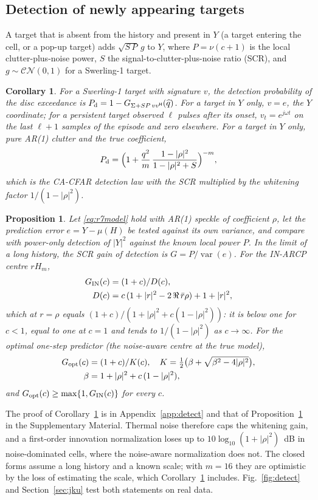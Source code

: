 \documentclass[journal]{IEEEtran}
\newtheorem{proposition}{Proposition}
\newtheorem{corollary}{Corollary}
\begin{document}
\subsection{Detection of newly appearing targets}
A target that is absent from the history and present in $Y$ (a target entering the cell, or a pop-up target) adds $\sqrt{S\,P}\,g$ to $Y$, where $P=\nu(c+1)$ is the local clutter-plus-noise power, $S$ the signal-to-clutter-plus-noise ratio (SCR), and $g\sim\mathcal{CN}(0,1)$ for a Swerling-1 target.
\begin{corollary}\label{cor:detect}
For a Swerling-1 target with signature $v$, the detection probability of the disc exceedance is $P_{\rm d}=1-G_{\Sigma+SP\,vv^{\mathsf H}}(\widehat q)$. For a target in $Y$ only, $v=e$, the $Y$ coordinate; for a persistent target observed $\ell$ pulses after its onset, $v_t=e^{j\omega t}$ on the last $\ell+1$ samples of the episode and zero elsewhere. For a target in $Y$ only, pure AR(1) clutter and the true coefficient,
\begin{equation}
P_{\rm d}=\Big(1+\frac{q^2}{m}\,\frac{1-|\rho|^2}{1-|\rho|^2+S}\Big)^{-m},
\label{eq:pdclosed}
\end{equation}
which is the CA-CFAR detection law with the SCR multiplied by the whitening factor $1/(1-|\rho|^2)$.
\end{corollary}
\begin{proposition}\label{prop:gain}
Let \eqref{eq:r7model} hold with AR(1) speckle of coefficient $\rho$, let the prediction error $e=Y-\mu(H)$ be tested against its own variance, and compare with power-only detection of $|Y|^2$ against the known local power $P$. In the limit of a long history, the SCR gain of detection is $G=P/\operatorname{var}(e)$. For the IN-ARCP centre $rH_m$,
\begin{align}
G_{\rm IN}(c)&=(1+c)/D(c),\label{eq:gin}\\
D(c)&=c\,(1+|r|^2-2\,\Re\,\bar r\rho)+1+|r|^2,\nonumber
\end{align}
which at $r=\rho$ equals $(1+c)/(1+|\rho|^2+c(1-|\rho|^2))$: it is below one for $c<1$, equal to one at $c=1$ and tends to $1/(1-|\rho|^2)$ as $c\to\infty$. For the optimal one-step predictor (the noise-aware centre at the true model),
\begin{align}
G_{\rm opt}(c)&=(1+c)/K(c),\quad K=\tfrac12\big(\beta+\sqrt{\beta^2-4|\rho|^2}\big),\label{eq:gopt}\\
\beta&=1+|\rho|^2+c\,(1-|\rho|^2),\nonumber
\end{align}
and $G_{\rm opt}(c)\ge\max\{1,G_{\rm IN}(c)\}$ for every $c$.
\end{proposition}
The proof of Corollary~\ref{cor:detect} is in Appendix~\ref{app:detect} and that of Proposition~\ref{prop:gain} in the Supplementary Material. Thermal noise therefore caps the whitening gain, and a first-order innovation normalization loses up to $10\log_{10}(1+|\rho|^2)$~dB in noise-dominated cells, where the noise-aware normalization does not. The closed forms assume a long history and a known scale; with $m=16$ they are optimistic by the loss of estimating the scale, which Corollary~\ref{cor:detect} includes. Fig.~\ref{fig:detect} and Section~\ref{sec:jku} test both statements on real data.
\end{document}

